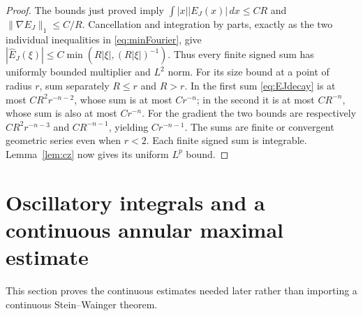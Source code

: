 \documentclass[11pt,oneside]{article}
\theoremstyle{definition}\newtheorem{definition}[theorem]{Definition}
\theoremstyle{remark}\newtheorem{remark}[theorem]{Remark}
\begin{document}
\begin{proof}
The bounds just proved imply
$\int |x||E_J(x)|\,dx\leq CR$ and
$\|\nabla E_J\|_1\leq C/R$. Cancellation and integration by parts, exactly
as the two individual inequalities in \eqref{eq:minFourier}, give
$|\widehat E_J(\xi)|\leq C\min(R|\xi|,(R|\xi|)^{-1})$.
Thus every finite signed sum has uniformly bounded multiplier and $L^2$ norm.
For its size bound at a point of radius $r$, sum separately $R\leq r$ and
$R>r$. In the first sum \eqref{eq:EJdecay} is at most
$CR^2r^{-n-2}$, whose sum is at most $Cr^{-n}$; in the second it is at most
$CR^{-n}$, whose sum is also at most $Cr^{-n}$. For the gradient the two
bounds are respectively $CR^2r^{-n-3}$ and $CR^{-n-1}$, yielding
$Cr^{-n-1}$. The sums are finite or convergent geometric series even when
$r<2$. Each finite signed sum is integrable. Lemma~\ref{lem:cz} now gives
its uniform $L^p$ bound.
\end{proof}

\section{Oscillatory integrals and a continuous annular maximal estimate}\label{sec:oscillation}
This section proves the continuous estimates needed later rather than importing
a continuous Stein--Wainger theorem.
\end{document}
